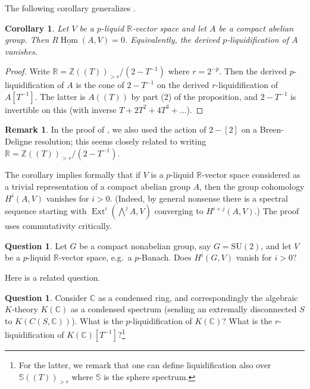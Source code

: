 \documentclass[11pt]{amsbook}
\DeclareMathOperator{\Hom}{Hom}
\DeclareMathOperator{\Ext}{Ext}
\newcommand{\intHom}{\underline{\Hom}}
\numberwithin{equation}{section}
\numberwithin{theorem}{section}
\newtheorem{corollary}[theorem]{Corollary}
\theoremstyle{definition}
\newtheorem{remark}[theorem]{Remark}
\newtheorem{question}[theorem]{Question}
\begin{document}
The following corollary generalizes \cite[Theorem 4.3 (ii)]{Condensed}.

\begin{corollary} Let $V$ be a $p$-liquid $\mathbb R$-vector space and let $A$ be a compact abelian group. Then $R\intHom(A,V)=0$. Equivalently, the derived $p$-liquidification of $A$ vanishes.
\end{corollary}

\begin{proof} Write $\mathbb R=\mathbb Z((T))_{>r}/(2-T^{-1})$ where $r=2^{-p}$. Then the derived $p$-liquidification of $A$ is the cone of $2-T^{-1}$ on the derived $r$-liquidification of $A[T^{-1}]$. The latter is $A((T))$ by part (2) of the proposition, and $2-T^{-1}$ is invertible on this (with inverse $T+2T^2+4T^3+\ldots$).
\end{proof}

\begin{remark} In the proof of \cite[Theorem 4.3 (ii)]{Condensed}, we also used the action of $2-[2]$ on a Breen-Deligne resolution; this seems closely related to writing $\mathbb R=\mathbb Z((T))_{>r}/(2-T^{-1})$.
\end{remark}

The corollary implies formally that if $V$ is a $p$-liquid $\mathbb R$-vector space considered as a trivial representation of a compact abelian group $A$, then the group cohomology $H^i(A,V)$ vanishes for $i>0$. (Indeed, by general nonsense there is a spectral sequence starting with $\Ext^i(\bigwedge^j A,V)$ converging to $H^{i+j}(A,V)$.) The proof uses commutativity critically.

\begin{question} Let $G$ be a compact nonabelian group, say $G=\mathrm{SU}(2)$, and let $V$ be a $p$-liquid $\mathbb R$-vector space, e.g.~a $p$-Banach. Does $H^i(G,V)$ vanish for $i>0$?
\end{question}

Here is a related question.

\begin{question} Consider $\mathbb C$ as a condensed ring, and correspondingly the algebraic $K$-theory $K(\mathbb C)$ as a condensed spectrum (sending an extremally disconnected $S$ to $K(C(S,\mathbb C))$). What is the $p$-liquidification of $K(\mathbb C)$? What is the $r$-liquidification of $K(\mathbb C)[T^{-1}]$?\footnote{For the latter, we remark that one can define liquidification also over $\mathbb S((T))_{>r}$ where $\mathbb S$ is the sphere spectrum.}
\end{question}
\end{document}
